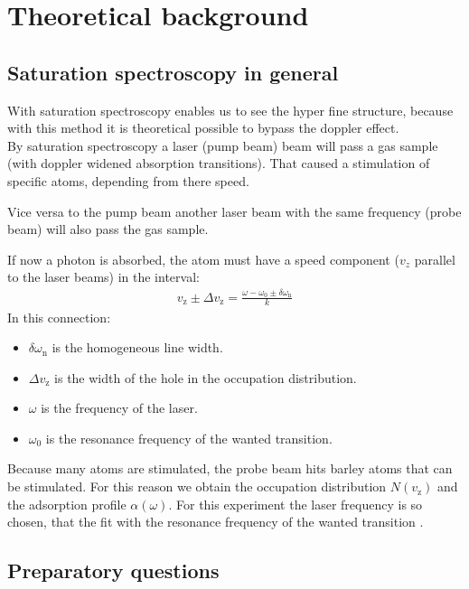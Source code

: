 \chapter{Theoretical background}

\section{Saturation spectroscopy in general}
With saturation spectroscopy enables us to see the hyper fine structure, because with this method it is theoretical possible to bypass the doppler effect. \\
By saturation spectroscopy a laser (pump beam) beam will pass a gas sample (with doppler widened absorption transitions). That caused a stimulation of specific atoms, depending from there speed. 

Vice versa to the pump beam another laser beam with the same frequency (probe beam) will also pass the gas sample.

If now a photon is absorbed, the atom must have a speed component ($v_z$ parallel to the laser beams) in the interval: 
\begin{gather}
    v_{\text{z}} \pm \Delta v_{\text{z}} = \frac{\omega -\omega_0 \pm \delta \omega_{\text{n}}}{k}
\end{gather}
In this connection: 
\begin{itemize} 
    \item $\delta \omega_{\text{n}}$ is the homogeneous line width.
    \item $\Delta v_{\text{z}}$ is the width of the hole in the occupation distribution.
    \item $\omega$ is the frequency of the laser.
    \item $\omega_0$ is the resonance frequency of the wanted transition.
\end{itemize}

Because many atoms are stimulated, the probe beam hits barley atoms that can be stimulated. For this reason we obtain the occupation distribution $N(v_{\text{z}})$ and the adsorption profile $\alpha(\omega)$. For this experiment the laser frequency is so chosen, that the fit with the resonance frequency of the wanted transition \citep{VA00}.

\newpage
\section{Preparatory questions}

